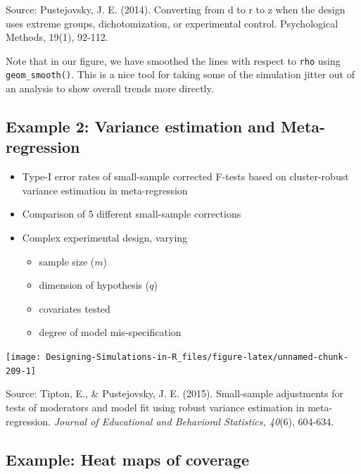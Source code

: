 \documentclass[
]{book}
\providecommand{\tightlist}{%
  \setlength{\itemsep}{0pt}\setlength{\parskip}{0pt}}
\begin{document}
Source: Pustejovsky, J. E. (2014). Converting from d to r to z when the design uses extreme groups, dichotomization, or experimental control. Psychological Methods, 19(1), 92-112.

Note that in our figure, we have smoothed the lines with respect to \texttt{rho} using \texttt{geom\_smooth()}.
This is a nice tool for taking some of the simulation jitter out of an analysis to show overall trends more directly.

\hypertarget{example-2-variance-estimation-and-meta-regression}{%
\subsection{Example 2: Variance estimation and Meta-regression}\label{example-2-variance-estimation-and-meta-regression}}

\begin{itemize}
\tightlist
\item
  Type-I error rates of small-sample corrected F-tests based on cluster-robust variance estimation in meta-regression
\item
  Comparison of 5 different small-sample corrections
\item
  Complex experimental design, varying

  \begin{itemize}
  \tightlist
  \item
    sample size (\(m\))
  \item
    dimension of hypothesis (\(q\))
  \item
    covariates tested
  \item
    degree of model mis-specification
  \end{itemize}
\end{itemize}

\begin{center}\texttt{[image: Designing-Simulations-in-R\_files/figure-latex/unnamed-chunk-209-1]} \end{center}

Source: Tipton, E., \& Pustejovsky, J. E. (2015). Small-sample adjustments for tests of moderators and model fit using robust variance estimation in meta-regression. \emph{Journal of Educational and Behavioral Statistics, 40}(6), 604-634.

\hypertarget{example-heat-maps-of-coverage}{%
\subsection{Example: Heat maps of coverage}\label{example-heat-maps-of-coverage}}
\end{document}

